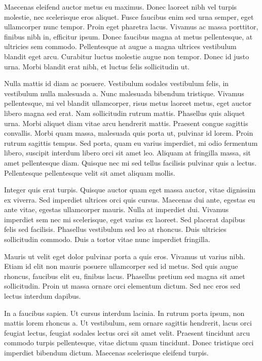 Maecenas eleifend auctor metus eu maximus. Donec laoreet nibh vel turpis molestie, nec scelerisque eros aliquet. Fusce faucibus enim sed urna semper, eget ullamcorper nunc tempor. Proin eget pharetra lacus. Vivamus ac massa porttitor, finibus nibh in, efficitur ipsum. Donec faucibus magna at metus pellentesque, at ultricies sem commodo. Pellentesque at augue a magna ultrices vestibulum blandit eget arcu. Curabitur luctus molestie augue non tempor. Donec id justo urna. Morbi blandit erat nibh, et luctus felis sollicitudin ut.

Nulla mattis id diam ac posuere. Vestibulum sodales vestibulum felis, in vestibulum nulla malesuada a. Nunc malesuada bibendum tristique. Vivamus pellentesque, mi vel blandit ullamcorper, risus metus laoreet metus, eget auctor libero magna sed erat. Nam sollicitudin rutrum mattis. Phasellus quis aliquet urna. Morbi aliquet diam vitae arcu hendrerit mattis. Praesent congue sagittis convallis. Morbi quam massa, malesuada quis porta ut, pulvinar id lorem. Proin rutrum sagittis tempus. Sed porta, quam eu varius imperdiet, mi odio fermentum libero, suscipit interdum libero orci sit amet leo. Aliquam at fringilla massa, sit amet pellentesque diam. Quisque nec mi sed tellus facilisis pulvinar quis a lectus. Pellentesque pellentesque velit sit amet aliquam mollis.

Integer quis erat turpis. Quisque auctor quam eget massa auctor, vitae dignissim ex viverra. Sed imperdiet ultrices orci quis cursus. Maecenas dui ante, egestas eu ante vitae, egestas ullamcorper mauris. Nulla at imperdiet dui. Vivamus imperdiet sem nec mi scelerisque, eget varius ex laoreet. Sed placerat dapibus felis sed facilisis. Phasellus vestibulum sed leo at rhoncus. Duis ultricies sollicitudin commodo. Duis a tortor vitae nunc imperdiet fringilla.

Mauris ut velit eget dolor pulvinar porta a quis eros. Vivamus ut varius nibh. Etiam id elit non mauris posuere ullamcorper sed id metus. Sed quis augue rhoncus, faucibus elit eu, finibus lacus. Phasellus pretium sed magna sit amet sollicitudin. Proin ut massa ornare orci elementum dictum. Sed nec eros sed lectus interdum dapibus.

In a faucibus sapien. Ut cursus interdum lacinia. In rutrum porta ipsum, non mattis lorem rhoncus a. Ut vestibulum, sem ornare sagittis hendrerit, lacus orci feugiat lectus, feugiat sodales lectus orci sit amet velit. Praesent tincidunt arcu commodo turpis pellentesque, vitae dictum quam tincidunt. Donec tristique orci imperdiet bibendum dictum. Maecenas scelerisque eleifend turpis.

